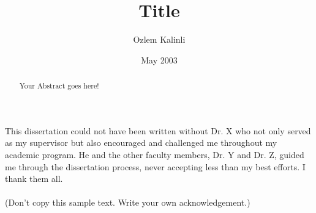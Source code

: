 \documentclass{iitthesis}
\begin{document}
\title{Title}
\author{Ozlem Kalinli}
\date{May 2003}
\copyrightnoticetrue      %
\maketitle                %


\prelimpages         %


\begin{acknowledgement}     %
\par  This dissertation could not have been written without Dr. X
who not only served as my supervisor but also encouraged and
challenged me throughout my academic program. He and the other
faculty members, Dr. Y and Dr. Z, guided me through the
dissertation process, never accepting less than my best efforts. I
thank them all.\\ \\ (Don't copy this sample text. Write your own
acknowledgement.)
\end{acknowledgement}


\tableofcontents
\clearpage

\listoftables

\clearpage

\listoffigures

\clearpage


\listofsymbols


 \clearpage



\begin{abstract}           %
\par Your Abstract goes here!
\end{abstract}
\end{document}
